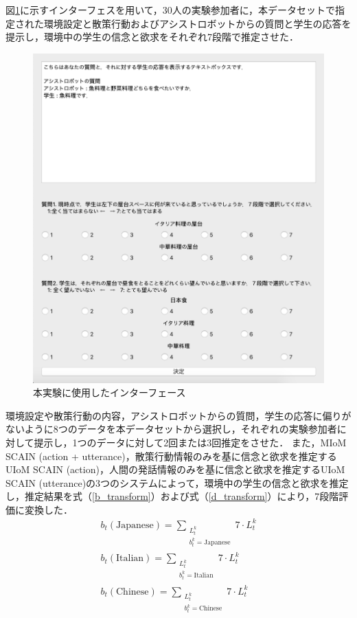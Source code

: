 \par
図\ref{fig:interface}に示すインターフェスを用いて，30人の実験参加者に，本データセットで指定された環境設定と散策行動およびアシストロボットからの質問と学生の応答を提示し，環境中の学生の信念と欲求をそれぞれ7段階で推定させた．
\begin{figure}[htbp]
  \begin{center}
    \includegraphics[scale=0.6]{./interface.pdf}
    \caption{本実験に使用したインターフェース}
    \label{fig:interface}
  \end{center}
\end{figure}
環境設定や散策行動の内容，アシストロボットからの質問，学生の応答に偏りがないように8つのデータを本データセットから選択し，それぞれの実験参加者に対して提示し，1つのデータに対して2回または3回推定をさせた．
また，MIoM SCAIN (action + utterance)，散策行動情報のみを基に信念と欲求を推定するUIoM SCAIN (action)，人間の発話情報のみを基に信念と欲求を推定するUIoM SCAIN (utterance)の3つのシステムによって，環境中の学生の信念と欲求を推定し，推定結果を式（\ref{b_transform}）および式（\ref{d_transform}）により，7段階評価に変換した．
\begin{equation}
  \begin{split}
  \label{b_transform}
  b_t(\mathrm{Japanese})= \sum_{\substack{L_t^k\\b_t^k=\mathrm{Japanese}}} 7\cdot L^k_t\\
  b_t(\mathrm{Italian})=\sum_{\substack{L_t^k\\b_t^k=\mathrm{Italian}}} 7\cdot L^k_t\\
  b_t(\mathrm{Chinese})=\sum_{\substack{L_t^k\\b_t^k=\mathrm{Chinese}}} 7\cdot L^k_t\\
  \end{split}
\end{equation}

